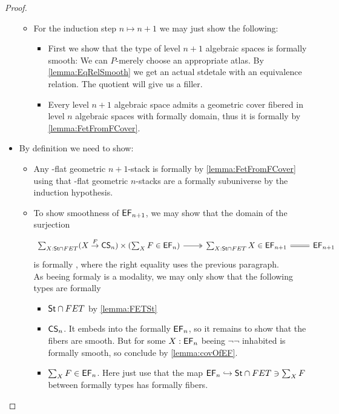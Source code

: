 \begin{proof}
\begin{itemize}
\begin{itemize}
			\item For the induction step $n \mapsto n+1$ we may just show the following:
			\begin{itemize}
				\item 	First we show that the type of level $n+1$ algebraic spaces is formally smooth: We can $P$-merely choose an appropriate atlas. By \ref{lemma:EqRelSmooth} we get an actual stdetale with an equivalence relation. The quotient will give us a filler. \\
				\item Every level $n+1$ algebraic space admits a geometric cover fibered in level $n$ algebraic spaces with formally \etale domain, thus it is formally \etale by \ref{lemma:FetFromFCover}.
			\end{itemize}
		\end{itemize}
		\item By definition we need to show:
		\begin{itemize}
			\item Any \etale-flat geometric $n+1$-stack is formally \etale by \ref{lemma:FetFromFCover} using that \etale-flat geometric $n$-stacks are a formally \etale subuniverse by the induction hypothesis.
			\item To show smoothness of $\mathsf{EF}_{n+1}$, we may show \todocite that the domain of the surjection
			\[\begin{tikzcd}
				{\sum_{X : \St \cap FET}(X \overset{F}{\to} \CS_{n}) \times (\sum_{X} F \in \EF_n)} & {\sum_{X : \St \cap FET} X \in \EF_{n+1}} & {\EF_{n+1}}
				\arrow[two heads, from=1-1, to=1-2]
				\arrow[Rightarrow, no head, from=1-2, to=1-3]
			\end{tikzcd}\]
			is formally \etale, where the right equality uses the previous paragraph. \\
			As beeing formaly \etale is a modality, we may only show that the following types are formally \etale
			\begin{itemize}
				\item $\mathsf{St} \cap FET$ by \ref{lemma:FETSt}
				\item $\mathsf{CS}_n$. It embeds into the formally \etale $\mathsf{EF}_n$, so it remains to show that the fibers are smooth. But for some $X : \mathsf{EF}_n$ beeing $\lnot \lnot$ inhabited is formally smooth, so conclude by \ref{lemma:covOfEF}.
				\item $\sum_X F \in \mathsf{EF}_n$. Here just use that the map $\mathsf{EF}_n \hookrightarrow \mathsf{St} \cap FET \ni \sum_X F$ between formally \etale types has formally \etale fibers.
			\end{itemize} 
		\end{itemize}
	\end{itemize}
\end{proof}
